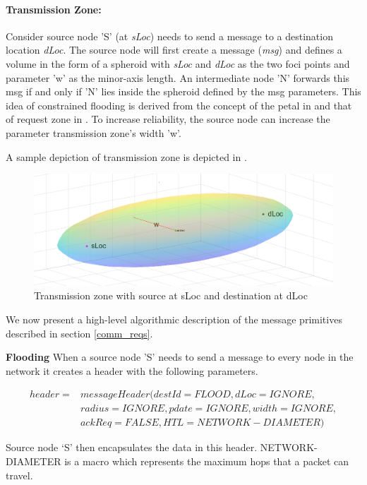 \paragraph{Transmission Zone:} Consider source node 'S' (at \emph{sLoc}) needs to send a message to a destination location \emph{dLoc}. The source node will first create a message (\emph{msg}) and defines a volume in the form of a spheroid with \emph{sLoc} and \emph{dLoc} as the two foci points and parameter 'w' as the minor-axis length. An intermediate node 'N' forwards this msg if and only if 'N' lies inside the spheroid defined by the msg parameters. This idea of constrained flooding is derived from the concept of the petal in \cite{6133499} and that of request zone in \cite{Ko:1998:LRM:288235.288252}. To increase reliability, the source node can increase the parameter transmission zone's width 'w'.

A sample depiction of transmission zone is depicted in .

\begin{figure}[hbtp]
\centering
\includegraphics[width=1\textwidth]{Chapter-3/figs/Spheroid}
\caption{Transmission zone with source at sLoc and destination at dLoc}
\label{fig:spheroid}
\end{figure}

We now present a high-level algorithmic description of the message primitives described in section \ref{comm_reqs}.

\textbf{Flooding}
When a source node 'S' needs to send a message to every node in the network it creates a header with the following parameters.

\begin{eqnarray*}
header = & messageHeader(destId = FLOOD, dLoc = IGNORE, \\
    & radius = IGNORE, pdate = IGNORE, width = IGNORE, \\
    & ackReq = FALSE, HTL = NETWORK-DIAMETER)
\end{eqnarray*} 

Source node `S' then encapsulates the data in this header. NETWORK-DIAMETER is a macro which represents the maximum hops that a packet can travel. 

